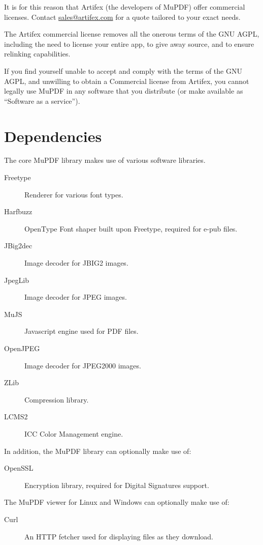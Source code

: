 \documentclass[oneside]{book}
\begin{document}
It is for this reason that Artifex (the developers of MuPDF) offer commercial licenses. Contact \href{mailto:sales@artifex.com}{sales@artifex.com} for a quote tailored to your exact needs.

The Artifex commercial license removes all the onerous terms of the GNU AGPL, including the need to license your entire app, to give away source, and to ensure relinking capabilities.

If you find yourself unable to accept and comply with the terms of the GNU AGPL, and unwilling to obtain a Commercial license from Artifex, you cannot legally use MuPDF in any software that you distribute (or make available as ``Software as a service'').


\section{Dependencies}

The core MuPDF library makes use of various software libraries.

\begin{description}
\item[Freetype] Renderer for various font types.
\item[Harfbuzz] OpenType Font shaper built upon Freetype, required for e-pub files.
\item[JBig2dec] Image decoder for JBIG2 images.
\item[JpegLib] Image decoder for JPEG images.
\item[MuJS] Javascript engine used for PDF files.
\item[OpenJPEG] Image decoder for JPEG2000 images.
\item[ZLib] Compression library.
\item[LCMS2] ICC Color Management engine.
\end{description}

In addition, the MuPDF library can optionally make use of:

\begin{description}
\item[OpenSSL] Encryption library, required for Digital Signatures support.
\end{description}

The MuPDF viewer for Linux and Windows can optionally make use of:

\begin{description}
\item[Curl] An HTTP fetcher used for displaying files as they download.
\end{description}
\end{document}
